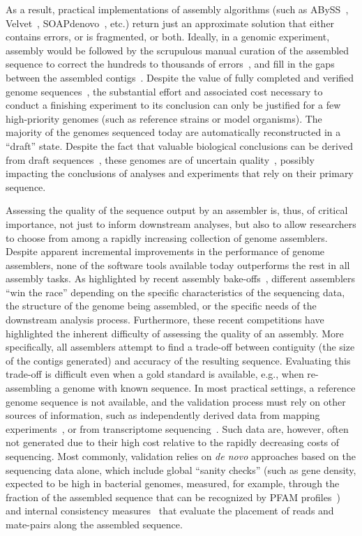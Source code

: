 As a result, practical implementations of assembly algorithms (such as
ABySS~\cite{ABySS}, Velvet~\cite{Velvet},
SOAPdenovo~\cite{SOAPdenovo}, etc.) return just an approximate
solution that either contains errors, or is fragmented, or both.
Ideally, in a genomic experiment, assembly would be followed by the
scrupulous manual curation of the assembled sequence to correct the
hundreds to thousands of errors~\cite{salzberg2005misassemblies}, and
fill in the gaps between the assembled
contigs~\cite{nagarajan2010finishing}. Despite the value of fully
completed and verified genome sequences~\cite{fraser2002value}, the
substantial effort and associated cost necessary to conduct a
finishing experiment to its conclusion can only be justified for a
few high-priority genomes (such as reference strains or model
organisms). The majority of the genomes sequenced today are
automatically reconstructed in a ``draft'' state.  Despite the fact
that valuable biological conclusions can be derived from draft
sequences~\cite{branscomb2002high}, these genomes are of uncertain
quality~\cite{chain2009genome}, possibly impacting the conclusions of
analyses and experiments that rely on their primary sequence.

Assessing the quality of the sequence output by an assembler is, thus,
of critical importance, not just to inform downstream analyses, but
also to allow researchers to choose from among a rapidly increasing
collection of genome assemblers. Despite apparent incremental
improvements in the performance of genome assemblers, none of the
software tools available today outperforms the rest in all assembly
tasks.  As highlighted by recent assembly
bake-offs~\cite{earl2011assemblathon,salzberg2011gage}, different
assemblers ``win the race'' depending on the specific characteristics
of the sequencing data, the structure of the genome being assembled,
or the specific needs of the downstream analysis process.
Furthermore, these recent competitions have highlighted the inherent
difficulty of assessing the quality of an assembly.  More
specifically, all assemblers attempt to find a trade-off between
contiguity (the size of the contigs generated) and accuracy of the
resulting sequence.  Evaluating this trade-off is difficult even when
a gold standard is available, e.g., when re-assembling a genome with
known sequence.  In most practical settings, a reference genome
sequence is not available, and the validation process must rely on
other sources of information, such as independently derived data from
mapping experiments~\cite{zhou2007validation}, or from transcriptome
sequencing~\cite{adamidi2011novo}. Such data are, however, often not
generated due to their high cost relative to the rapidly decreasing
costs of sequencing. Most commonly, validation relies on \emph{de
  novo} approaches based on the sequencing data alone, which include
global ``sanity checks'' (such as gene density, expected to be high in
bacterial genomes, measured, for example, through the fraction of the
assembled sequence that can be recognized by PFAM
profiles~\cite{genovo2011}) and internal consistency
measures~\cite{amosvalidate2008} that evaluate the placement of reads
and mate-pairs along the assembled sequence.

